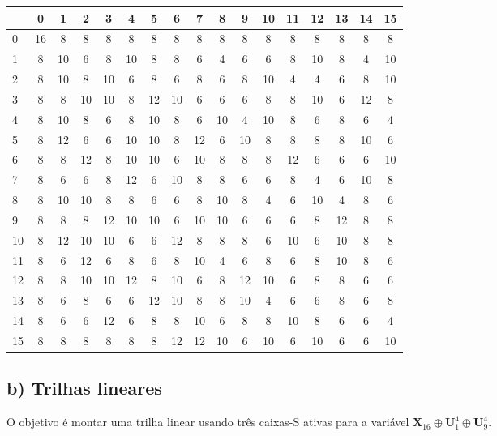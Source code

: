 \documentclass{article}
\newcommand{\xor}{\oplus}
\newcommand{\X}{\textbf{X}}
\newcommand{\U}{\textbf{U}}
\begin{document}
\begin{tabular}{l | *{16}c}
  &  0 &  1 &  2 &  3 &  4 &  5 &  6 &  7 &  8 &  9 & 10 & 11 & 12 & 13 & 14 & 15 \\
\hline
0 & 16 &  8 &  8 &  8 &  8 &  8 &  8 &  8 &  8 &  8 &  8 &  8 &  8 &  8 &  8 &  8 \\
1 &  8 & 10 &  6 &  8 & 10 &  8 &  8 &  6 &  4 &  6 &  6 &  8 & 10 &  8 &  4 & 10 \\
2 &  8 & 10 &  8 & 10 &  6 &  8 &  6 &  8 &  6 &  8 & 10 &  4 &  4 &  6 &  8 & 10 \\
3 &  8 &  8 & 10 & 10 &  8 & 12 & 10 &  6 &  6 &  6 &  8 &  8 & 10 &  6 & 12 &  8 \\
4 &  8 & 10 &  8 &  6 &  8 & 10 &  8 &  6 & 10 &  4 & 10 &  8 &  6 &  8 &  6 &  4 \\
5 &  8 & 12 &  6 &  6 & 10 & 10 &  8 & 12 &  6 & 10 &  8 &  8 &  8 &  8 & 10 &  6 \\
6 &  8 &  8 & 12 &  8 & 10 & 10 &  6 & 10 &  8 &  8 &  8 & 12 &  6 &  6 &  6 & 10 \\
7 &  8 &  6 &  6 &  8 & 12 &  6 & 10 &  8 &  8 &  6 &  6 &  8 &  4 &  6 & 10 &  8 \\
8 &  8 & 10 & 10 &  8 &  8 &  6 &  6 &  8 & 10 &  8 &  4 &  6 & 10 &  4 &  8 &  6 \\
9 &  8 &  8 &  8 & 12 & 10 & 10 &  6 & 10 & 10 &  6 &  6 &  6 &  8 & 12 &  8 &  8 \\
10 & 8 & 12 & 10 & 10 &  6 &  6 & 12 &  8 &  8 &  8 &  6 & 10 &  6 & 10 &  8 &  8 \\
11 & 8 &  6 & 12 &  6 &  8 &  6 &  8 & 10 &  4 &  6 &  8 &  6 &  8 & 10 &  8 &  6 \\
12 & 8 &  8 & 10 & 10 & 12 &  8 & 10 &  6 &  8 & 12 & 10 &  6 &  8 &  8 &  6 &  6 \\
13 & 8 &  6 &  8 &  6 &  6 & 12 & 10 &  8 &  8 & 10 &  4 &  6 &  6 &  8 &  6 &  8 \\
14 & 8 &  6 &  6 & 12 &  6 &  8 &  8 & 10 &  6 &  8 &  8 & 10 &  8 &  6 &  6 &  4 \\
15 & 8 &  8 &  8 &  8 &  8 &  8 & 12 & 12 & 10 &  6 & 10 &  6 & 10 &  6 &  6 & 10 \\
\end{tabular}

\subsection{b) Trilhas lineares}

O objetivo é montar uma trilha linear usando três caixas-S ativas
para a variável $\X_{16} \xor \U_1^4 \xor \U_9^4$.
\end{document}
